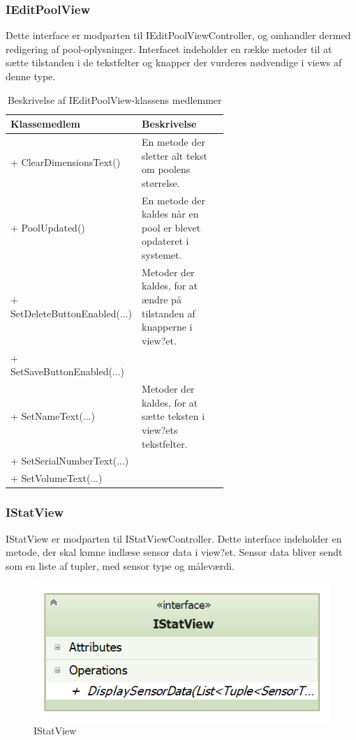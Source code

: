 \subsubsection{IEditPoolView}
Dette interface er modparten til IEditPoolViewController, og omhandler dermed redigering af pool-oplysninger. Interfacet indeholder en række metoder til at sætte tilstanden i de tekstfelter og knapper der vurderes nødvendige i views af denne type.

\begin{table}
	\centering
	\begin{tabular}{| l | p{0.62\linewidth} |}
		\toprule
		\textbf{Klassemedlem}	& \textbf{Beskrivelse} \\
		\midrule
		+ ClearDimensionsText()				 &En metode der sletter alt tekst om poolens størrelse. \\\hline
		+ PoolUpdated()					& En metode der kaldes når en pool er blevet opdateret i systemet. \\\hline
		+ SetDeleteButtonEnabled(...)				& Metoder der kaldes, for at ændre på tilstanden af knapperne i view?et. \\
		+ SetSaveButtonEnabled(...)				& \\\hline
		+ SetNameText(...)						& Metoder der kaldes, for at sætte teksten i view?ets tekstfelter.
 \\
		+ SetSerialNumberText(...)				& \\
		+ SetVolumeText(...)						& \\
		\bottomrule
		\end{tabular}
	\caption{Beskrivelse af IEditPoolView-klassens medlemmer}
	\label{tab:table_design_ieditPoolview}	
\end{table}

\subsubsection{IStatView}
IStatView er modparten til IStatViewController. Dette interface indeholder en metode, der skal kunne indlæse sensor data i view?et. Sensor data bliver sendt som en liste af tupler, med sensor type og måleværdi.

\begin{figure}
	\centering
	\includegraphics[width=0.3\linewidth]{figs/design/application_istatview}
	\caption{IStatView}
	\label{fig:application_istatview}
\end{figure}

